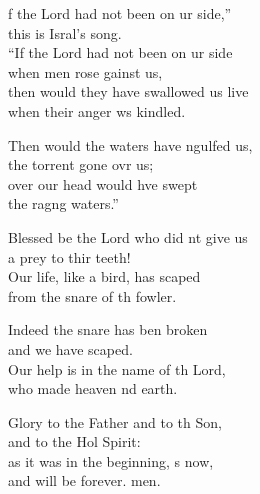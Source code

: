 \settowidth{\versewidth}{then would they have swallowed us alive *}
\begin{psalmverse}%
  \begin{patverse}
f the Lord had not been on ur side,”\Med\\
this is Isral’s song.\\
“If the Lord had not been on ur side\Med\\
when men rose gainst us,\\
then would they have swallowed us live\Med\\
when their anger ws kindled.

Then would the waters have ngulfed us,\Med\\
the torrent gone ovr us;\\
over our head would hve swept\Med\\
the rag\pointup{\i}ng waters.”

Blessed be the Lord who did nt give us\Med\\
a prey to thir teeth!\\
Our life, like a bird, has scaped\Med\\
from the snare of th fowler.

Indeed the snare has ben broken\Med\\
and we have scaped.\\
Our help is in the name of th Lord,\Med\\
who made heaven nd earth.

Glory to the Father and to th Son,\Med\\
and to the Hol Spirit:\\
as it was in the beginning, \pointup{\i}s now,\Med\\
and will be forever. men. 
  \end{patverse}
\end{psalmverse}
